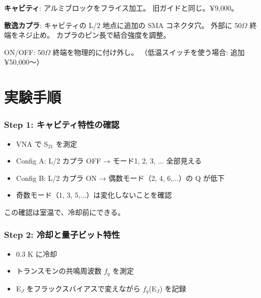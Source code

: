 \documentclass[12pt,a4paper]{article}
\begin{document}
\begin{expbox}[自作可能]
\textbf{キャビティ}: アルミブロックをフライス加工。
旧ガイドと同じ。¥9,000。

\textbf{散逸カプラ}: キャビティの L/2 地点に追加の SMA コネクタ穴。
外部に 50$\Omega$ 終端をネジ止め。
カプラのピン長で結合強度を調整。

ON/OFF: 50$\Omega$ 終端を物理的に付け外し。
（低温スイッチを使う場合: 追加 ¥50,000〜）
\end{expbox}

\part{実験手順}

\section{Step 1: キャビティ特性の確認}

\begin{expbox}[室温テスト]
\begin{itemize}
\item VNA で S$_{21}$ を測定
\item Config A: L/2 カプラ OFF → モード1, 2, 3, ... 全部見える
\item Config B: L/2 カプラ ON → 偶数モード（2, 4, 6,...）の Q が低下
\item 奇数モード（1, 3, 5,...）は変化しないことを確認
\end{itemize}

この確認は室温で、冷却前にできる。
\end{expbox}

\section{Step 2: 冷却と量子ビット特性}

\begin{expbox}[低温テスト]
\begin{itemize}
\item 0.3 K に冷却
\item トランスモンの共鳴周波数 $f_q$ を測定
\item E$_J$ をフラックスバイアスで変えながら $f_q$(E$_J$) を記録
\end{itemize}
\end{expbox}
\end{document}

